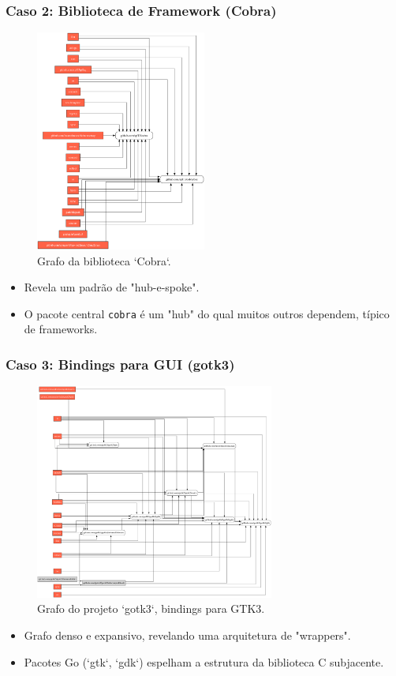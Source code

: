 \documentclass{beamer}
\begin{document}
\begin{frame}
  \frametitle{Caso 2: Biblioteca de Framework (Cobra)}
    \begin{figure}
        \includegraphics[width=0.5\textwidth]{images/github.com_spf13_cobra.png}
        \caption{Grafo da biblioteca `Cobra`.}
    \end{figure}
    \begin{itemize}
        \item Revela um padrão de "hub-e-spoke".
        \item O pacote central \texttt{cobra} é um "hub" do qual muitos outros dependem, típico de frameworks.
    \end{itemize}
\end{frame}

\begin{frame}
  \frametitle{Caso 3: Bindings para GUI (gotk3)}
    \begin{figure}
        \includegraphics[width=0.7\textwidth]{images/gotk3.png}
        \caption{Grafo do projeto `gotk3`, bindings para GTK3.}
    \end{figure}
    \begin{itemize}
        \item Grafo denso e expansivo, revelando uma arquitetura de "wrappers".
        \item Pacotes Go (`gtk`, `gdk`) espelham a estrutura da biblioteca C subjacente.
    \end{itemize}
\end{frame}
\end{document}
